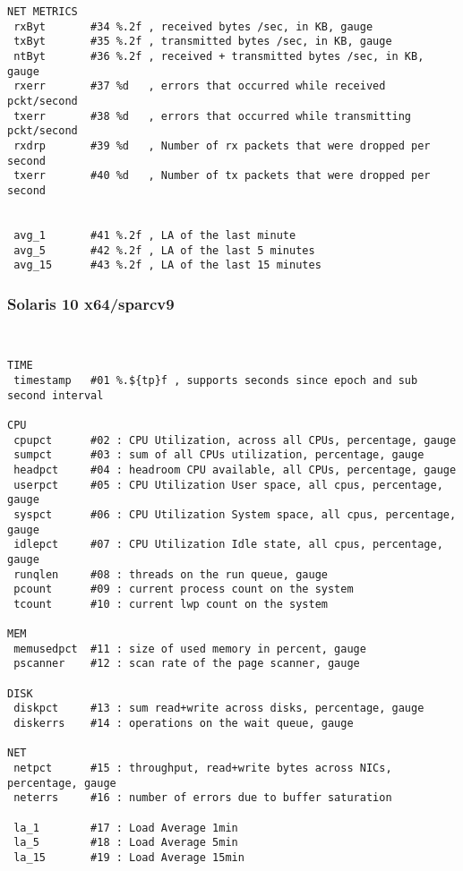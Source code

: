 \begin{verbatim}
NET METRICS
 rxByt       #34 %.2f , received bytes /sec, in KB, gauge
 txByt       #35 %.2f , transmitted bytes /sec, in KB, gauge
 ntByt       #36 %.2f , received + transmitted bytes /sec, in KB, gauge
 rxerr       #37 %d   , errors that occurred while received pckt/second
 txerr       #38 %d   , errors that occurred while transmitting pckt/second
 rxdrp       #39 %d   , Number of rx packets that were dropped per second
 txerr       #40 %d   , Number of tx packets that were dropped per second


 avg_1       #41 %.2f , LA of the last minute
 avg_5       #42 %.2f , LA of the last 5 minutes
 avg_15      #43 %.2f , LA of the last 15 minutes
\end{verbatim}

\subsubsection*{Solaris 10 x64/sparcv9}
\begin{verbatim}


TIME
 timestamp   #01 %.${tp}f , supports seconds since epoch and sub second interval

CPU
 cpupct      #02 : CPU Utilization, across all CPUs, percentage, gauge
 sumpct      #03 : sum of all CPUs utilization, percentage, gauge
 headpct     #04 : headroom CPU available, all CPUs, percentage, gauge
 userpct     #05 : CPU Utilization User space, all cpus, percentage, gauge
 syspct      #06 : CPU Utilization System space, all cpus, percentage, gauge
 idlepct     #07 : CPU Utilization Idle state, all cpus, percentage, gauge
 runqlen     #08 : threads on the run queue, gauge
 pcount      #09 : current process count on the system
 tcount      #10 : current lwp count on the system

MEM
 memusedpct  #11 : size of used memory in percent, gauge
 pscanner    #12 : scan rate of the page scanner, gauge

DISK
 diskpct     #13 : sum read+write across disks, percentage, gauge
 diskerrs    #14 : operations on the wait queue, gauge

NET
 netpct      #15 : throughput, read+write bytes across NICs, percentage, gauge
 neterrs     #16 : number of errors due to buffer saturation

 la_1        #17 : Load Average 1min
 la_5        #18 : Load Average 5min
 la_15       #19 : Load Average 15min

\end{verbatim}


\endinput
